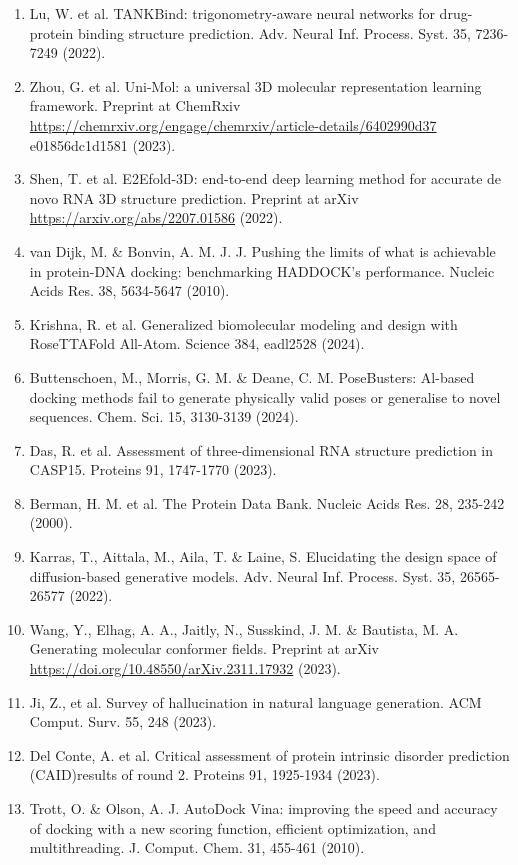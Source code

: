 \documentclass[10pt]{article}
\begin{document}
\begin{enumerate}
  \item Lu, W. et al. TANKBind: trigonometry-aware neural networks for drug-protein binding structure prediction. Adv. Neural Inf. Process. Syst. 35, 7236-7249 (2022).
  \item Zhou, G. et al. Uni-Mol: a universal 3D molecular representation learning framework. Preprint at ChemRxiv \href{https://chemrxiv.org/engage/chemrxiv/article-details/6402990d37}{https://chemrxiv.org/engage/chemrxiv/article-details/6402990d37} e01856dc1d1581 (2023).
  \item Shen, T. et al. E2Efold-3D: end-to-end deep learning method for accurate de novo RNA 3D structure prediction. Preprint at arXiv \href{https://arxiv.org/abs/2207.01586}{https://arxiv.org/abs/2207.01586} (2022).
  \item van Dijk, M. \& Bonvin, A. M. J. J. Pushing the limits of what is achievable in protein-DNA docking: benchmarking HADDOCK's performance. Nucleic Acids Res. 38, 5634-5647 (2010).
  \item Krishna, R. et al. Generalized biomolecular modeling and design with RoseTTAFold All-Atom. Science 384, eadl2528 (2024).
  \item Buttenschoen, M., Morris, G. M. \& Deane, C. M. PoseBusters: Al-based docking methods fail to generate physically valid poses or generalise to novel sequences. Chem. Sci. 15, 3130-3139 (2024).
  \item Das, R. et al. Assessment of three-dimensional RNA structure prediction in CASP15. Proteins 91, 1747-1770 (2023).
  \item Berman, H. M. et al. The Protein Data Bank. Nucleic Acids Res. 28, 235-242 (2000).
  \item Karras, T., Aittala, M., Aila, T. \& Laine, S. Elucidating the design space of diffusion-based generative models. Adv. Neural Inf. Process. Syst. 35, 26565-26577 (2022).
  \item Wang, Y., Elhag, A. A., Jaitly, N., Susskind, J. M. \& Bautista, M. A. Generating molecular conformer fields. Preprint at arXiv \href{https://doi.org/10.48550/arXiv.2311.17932}{https://doi.org/10.48550/arXiv.2311.17932} (2023).
  \item Ji, Z., et al. Survey of hallucination in natural language generation. ACM Comput. Surv. 55, 248 (2023).
  \item Del Conte, A. et al. Critical assessment of protein intrinsic disorder prediction (CAID)results of round 2. Proteins 91, 1925-1934 (2023).
  \item Trott, O. \& Olson, A. J. AutoDock Vina: improving the speed and accuracy of docking with a new scoring function, efficient optimization, and multithreading. J. Comput. Chem. 31, 455-461 (2010).

\end{enumerate}
\end{document}
